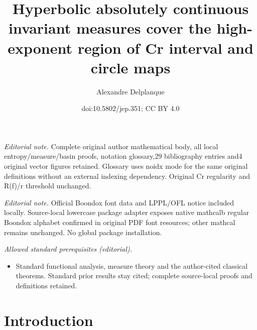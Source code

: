\documentclass[10pt]{amsart}
\title{Hyperbolic absolutely continuous invariant measures cover the high-exponent region of Cr interval and circle maps}
\author{Alexandre Delplanque}
\date{doi:10.5802/jep.351; CC BY 4.0}
\theoremstyle{definition}
\begin{document}
\maketitle
\noindent\textit{Editorial note.} Complete original author mathematical body, all local entropy/measure/basin proofs, notation glossary,29 bibliography entries and4 original vector figures retained. Glossary uses noidx mode for the same original definitions without an external indexing dependency. Original Cr regularity and R(f)/r threshold unchanged.\par\medskip
\noindent\textit{Editorial note.} Official Boondox font data and LPPL/OFL notice included locally. Source-local lowercase package adapter exposes native mathcalb regular Boondox alphabet confirmed in original PDF font resources; other mathcal remains unchanged. No global package installation.\par\medskip
\noindent\textit{Allowed standard prerequisites (editorial).}\begin{itemize}
\item Standard functional analysis, measure theory and the author-cited classical theorems. Standard prior results stay cited; complete source-local proofs and definitions retained.
\end{itemize}\medskip
\vspace*{-\baselineskip}
\tableofcontents


\section{Introduction}
\label{sec:intro}
\end{document}
